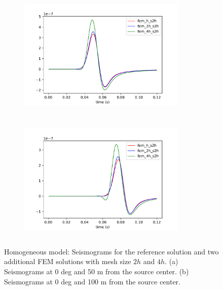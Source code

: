  \begin{figure}[h!]
 		\centering
		\begin{subfigure}{8cm}
				\includegraphics[width=8cm, height=6cm]{Thesis_Edith/figures/homo/homo_waves/fem_r50_0deg.pdf}
			     \caption{}
		\end{subfigure}
        \hspace{0.25cm}
		\begin{subfigure}{8cm}
				\includegraphics[width=8cm, height=6cm]{Thesis_Edith/figures/homo/homo_waves/fem_r100_0deg.pdf}
			   \caption{}
		\end{subfigure}
 
	\caption{Homogeneous model: Seismograms for the reference solution and two additional FEM solutions with mesh size $2h$ and $4h$. (a) Seismograms at 0 deg and 50 m from the source center. (b) Seismograms at 0 deg and 100 m from the source center.}  
	\label{fig:3.10}
\end{figure}

